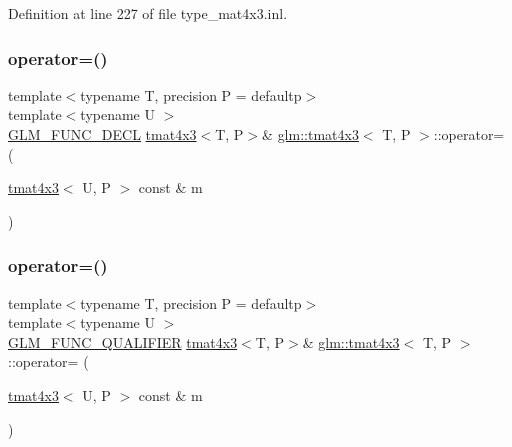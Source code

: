 Definition at line 227 of file type\+\_\+mat4x3.\+inl.

\mbox{\label{structglm_1_1tmat4x3_a1a8400e31fd17c23aff288242b7a78ca}} 
\subsubsection{\texorpdfstring{operator=()}{operator=()}\hspace{0.1cm}{\footnotesize\ttfamily [2/3]}}
{\footnotesize\ttfamily template$<$typename T, precision P = defaultp$>$ \\
template$<$typename U $>$ \\
\mbox{\hyperlink{setup_8hpp_ab2d052de21a70539923e9bcbf6e83a51}{G\+L\+M\+\_\+\+F\+U\+N\+C\+\_\+\+D\+E\+CL}} \mbox{\hyperlink{structglm_1_1tmat4x3}{tmat4x3}}$<$T, P$>$\& \mbox{\hyperlink{structglm_1_1tmat4x3}{glm\+::tmat4x3}}$<$ T, P $>$\+::operator= (\begin{DoxyParamCaption}\item[{\mbox{\hyperlink{structglm_1_1tmat4x3}{tmat4x3}}$<$ U, P $>$ const \&}]{m }\end{DoxyParamCaption})}

\mbox{\label{structglm_1_1tmat4x3_a45e2023a951f58d15675733993dd3f7a}} 
\subsubsection{\texorpdfstring{operator=()}{operator=()}\hspace{0.1cm}{\footnotesize\ttfamily [3/3]}}
{\footnotesize\ttfamily template$<$typename T, precision P = defaultp$>$ \\
template$<$typename U $>$ \\
\mbox{\hyperlink{setup_8hpp_a33fdea6f91c5f834105f7415e2a64407}{G\+L\+M\+\_\+\+F\+U\+N\+C\+\_\+\+Q\+U\+A\+L\+I\+F\+I\+ER}} \mbox{\hyperlink{structglm_1_1tmat4x3}{tmat4x3}}$<$T, P$>$\& \mbox{\hyperlink{structglm_1_1tmat4x3}{glm\+::tmat4x3}}$<$ T, P $>$\+::operator= (\begin{DoxyParamCaption}\item[{\mbox{\hyperlink{structglm_1_1tmat4x3}{tmat4x3}}$<$ U, P $>$ const \&}]{m }\end{DoxyParamCaption})}



